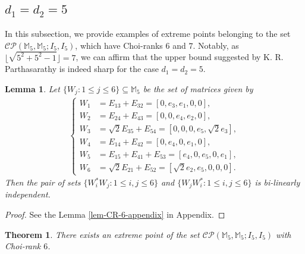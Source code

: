 \documentclass[10pt,reqno]{amsart}
\theoremstyle{definition}
\theoremstyle{plain}
\newtheorem{thm}[defn]{Theorem}
\newtheorem{lem}[defn]{Lemma}
\theoremstyle{remark}
\newcommand{\mbb}[1]{\mathbb{#1}}
\newcommand{\msc}[1]{\mathscr{#1}}
\newcommand{\M}[1]{\mbb{M}_{#1}}%
\numberwithin{equation}{section}%
\begin{document}
\begin{center}
	 \item\subsection{$d_1=d_2=5$}
\end{center}


In this subsection, we provide examples of extreme points belonging to the set $\msc{CP}(\M{5},\M{5}; I_{5}, I_{5})$, which have Choi-ranks $6$ and $7$. Notably, as $\lfloor\sqrt{5^2+5^2-1}\rfloor=7$, we can affirm that the upper bound suggested by K. R. Parthasarathy is indeed sharp for the case $d_1=d_2=5$.



\begin{lem}\label{lem-CR-6}
	Let $\{W_j:1\leq j\leq 6\}\subseteq\M{5}$ be the set of matrices given by 
	\small
	\begin{align}\label{eq-CR-6}
		\begin{cases}
			W_1&=E_{13}+E_{32}=[0,e_3,e_1,0,0],\\
			W_2&=E_{24}+E_{43}=[0,0,e_4,e_2,0],\\
			W_3&=\sqrt{2}E_{35}+E_{54}=[0,0,0,e_5,\sqrt{2}e_3],\\
			W_4&=E_{14}+E_{42}=[0,e_4,0,e_1,0],\\
			W_5&=E_{15}+E_{41}+E_{53}=[e_4,0,e_5,0,e_1],\\
			W_6&=\sqrt{2}E_{21}+E_{52}=[\sqrt{2}e_2,e_5,0,0,0].
		\end{cases}
	\end{align}
	\normalsize
	Then the pair of sets $\{W_i^*W_j:1\leq i,j\leq 6\}$ and $\{W_jW_i^*:1\leq i,j\leq 6\}$ is bi-linearly independent.
\end{lem}


\begin{proof}
	See the Lemma \ref{lem-CR-6-appendix} in Appendix.
\end{proof}


 \begin{thm}
	There exists an extreme point of the set $\msc{CP}(\M{5},\M{5}; I_{5}, I_{5})$ with Choi-rank $6$.
\end{thm}
\end{document}
